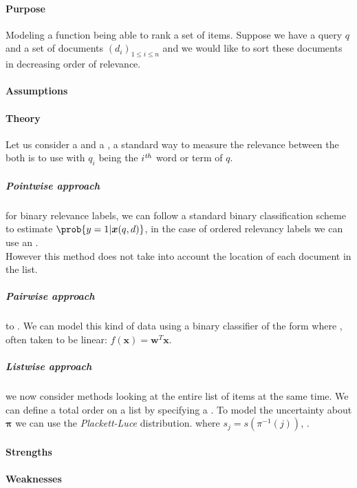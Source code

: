 \paragraph{Purpose}
Modeling a function being able to rank a set of items.
Suppose we have a query $q$ and a set of documents $(d_{i})_{1\leq i\leq n}$ and we would like to 
sort these documents in decreasing order of relevance. 

\paragraph{Assumptions}
\paragraph{Theory}
Let us consider a  and a , a standard way to measure the relevance
between the both is to use  with $q_{i}$ being the $i^{\text{\emph{th}}}$ word or term of $q$.
\subparagraph{Pointwise approach}
for binary relevance labels, we can follow a standard binary classification scheme to
estimate $\prob{y=1|\bm{x}(q,d)}$, in the case of ordered relevancy labels we can use
an .\\
However this method does not take into account the location of each document in the 
list.
\subparagraph{Pairwise approach}
to . We 
can model this kind of data using a binary classifier of the form  
where , often taken to be linear: $f(\bm{x}) = \bm{w}^{T}
\bm{x}$.

\subparagraph{Listwise approach}
we now consider methods looking at the entire list of items at the same time. We can 
define a total order on a list by specifying a .
To model the uncertainty about $\bm{\pi}$ we can use the \emph{Plackett-Luce} 
distribution.  where
$s_{j}=s\left(\pi^{-1}(j)\right)$, .
\paragraph{Strengths}
\paragraph{Weaknesses}
